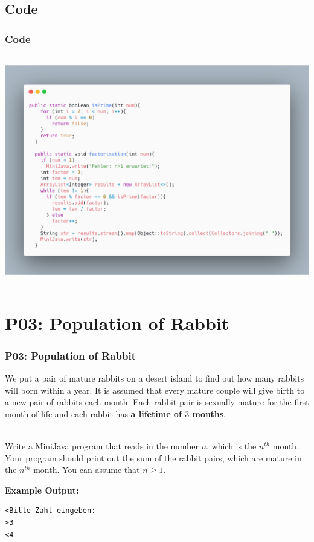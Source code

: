 \documentclass[handout, navsym]{tum-presentation}
\numberwithin{equation}{section}
\begin{document}
\subsection{Code}
\begin{frame}[fragile]
\frametitle{Code}
\vspace{-1cm}
\center \includegraphics[height=10cm]{p2-code.png}

\end{frame}

\section{P03: Population of Rabbit}
\begin{frame}[fragile]
\frametitle{P03: Population of Rabbit}
\vspace*{\fill} \large

We put a pair of mature rabbits on a desert island to find out how many rabbits will born within a year. It is assumed that every mature couple will give birth to a new pair of rabbits each month. Each rabbit pair is sexually mature for the first month of life and each rabbit has \textbf{a lifetime of $3$ months}.\par
~\\
Write a MiniJava program that reads in the number $n$, which is the $n^{th}$ month. Your program should print out the sum of the rabbit pairs, which are mature in the $n^{th}$ month. You can assume that $n \geq 1$. \par
\bigskip
\textbf{\large Example Output:}
\begin{lstlisting}
<Bitte Zahl eingeben:
>3
<4
\end{lstlisting}
\vspace*{\fill}
\end{frame}
\end{document}
